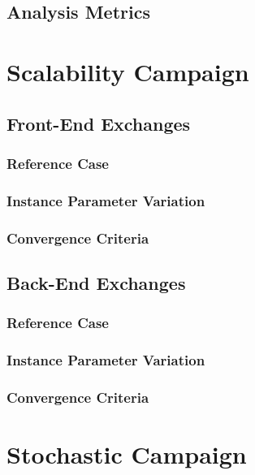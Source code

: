 \subsection{Analysis Metrics}

\section{Scalability Campaign}\label{results:scale}

\subsection{Front-End Exchanges}

\subsubsection{Reference Case}

\subsubsection{Instance Parameter Variation}

\subsubsection{Convergence Criteria}

\subsection{Back-End Exchanges}

\subsubsection{Reference Case}

\subsubsection{Instance Parameter Variation}

\subsubsection{Convergence Criteria}

\section{Stochastic Campaign}\label{results:stochastic}

